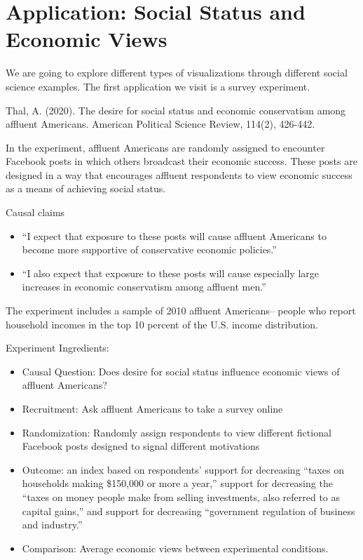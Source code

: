 \documentclass[
  letterpaper,
  DIV=11,
  numbers=noendperiod]{scrreprt}
\providecommand{\tightlist}{%
  \setlength{\itemsep}{0pt}\setlength{\parskip}{0pt}}\usepackage{longtable,booktabs,array}
\begin{document}
\hypertarget{application-social-status-and-economic-views}{%
\section{Application: Social Status and Economic
Views}\label{application-social-status-and-economic-views}}

We are going to explore different types of visualizations through
different social science examples. The first application we visit is a
survey experiment.

Thal, A. (2020). The desire for social status and economic conservatism
among affluent Americans. American Political Science Review, 114(2),
426-442.

In the experiment, affluent Americans are randomly assigned to encounter
Facebook posts in which others broadcast their economic success. These
posts are designed in a way that encourages affluent respondents to view
economic success as a means of achieving social status.

Causal claims

\begin{itemize}
\tightlist
\item
  ``I expect that exposure to these posts will cause affluent Americans
  to become more supportive of conservative economic policies.''
\item
  ``I also expect that exposure to these posts will cause especially
  large increases in economic conservatism among affluent men.''
\end{itemize}

The experiment includes a sample of 2010 affluent Americans-- people who
report household incomes in the top 10 percent of the U.S. income
distribution.

Experiment Ingredients:

\begin{itemize}
\tightlist
\item
  Causal Question: Does desire for social status influence economic
  views of affluent Americans?
\item
  Recruitment: Ask affluent Americans to take a survey online
\item
  Randomization: Randomly assign respondents to view different fictional
  Facebook posts designed to signal different motivations
\item
  Outcome: an index based on respondents' support for decreasing ``taxes
  on households making \$150,000 or more a year,'' support for
  decreasing the ``taxes on money people make from selling investments,
  also referred to as capital gains,'' and support for decreasing
  ``government regulation of business and industry.''
\item
  Comparison: Average economic views between experimental conditions.
\end{itemize}
\end{document}

